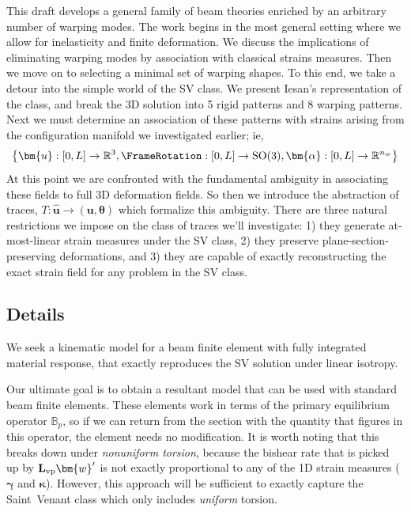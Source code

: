 \begin{Aside}
This draft develops a general family of beam theories enriched by an arbitrary number of warping modes. 
The work begins in the most general setting where we allow for inelasticity and finite deformation. 
We discuss the implications of eliminating warping modes by association with classical strains measures. 
Then we move on to selecting a minimal set of warping shapes. 
To this end, we take a detour into the simple world of the SV class. 
We present Iesan's representation of the class, and break the 3D solution into 5 rigid patterns and 8 warping patterns. 
Next we must determine an association of these patterns with strains arising from the configuration manifold we investigated earlier; ie, 
$$\left\{\bm{u}: [0,L]\rightarrow \mathbb{R}^3, \FrameRotation: [0,L]\rightarrow \mathrm{SO}(3), \bm{\alpha}: [0,L]\rightarrow \mathbb{R}^{n_w}\right\}$$ 
At this point we are confronted with the fundamental ambiguity in associating these fields to full 3D deformation fields. 
So then we introduce the abstraction of traces, $T: \hat{\bm u} \rightarrow (\bm{u}, \bm\theta)$ which formalize this ambiguity. 
There are three natural restrictions we impose on the class of traces we'll investigate: 1) they generate at-most-linear strain measures under the SV class, 2) they preserve plane-section-preserving deformations, and 3) they are capable of exactly reconstructing the exact strain field for any problem in the SV class.
\end{Aside}

\subsection{Details}
We seek a kinematic model for a beam finite element with fully integrated material response, that exactly reproduces the SV solution under linear isotropy. 

Our ultimate goal is to obtain a resultant model that can be used with standard beam finite elements. 
These elements work in terms of the primary equilibrium operator $\mathbb{B}_p$, so if we can return from the section with the quantity that figures in this operator, the element needs no modification. 
It is worth noting that this breaks down under \emph{nonuniform torsion}, because the bishear rate that is picked up by $\mathbf{L}_{\rm vp}\bm{w}'$ is not exactly proportional to any of the 1D strain measures ($\bm\gamma$ and $\bm\kappa$). 
However, this approach will be sufficient to exactly capture the Saint~Venant class which only includes \emph{uniform} torsion.



